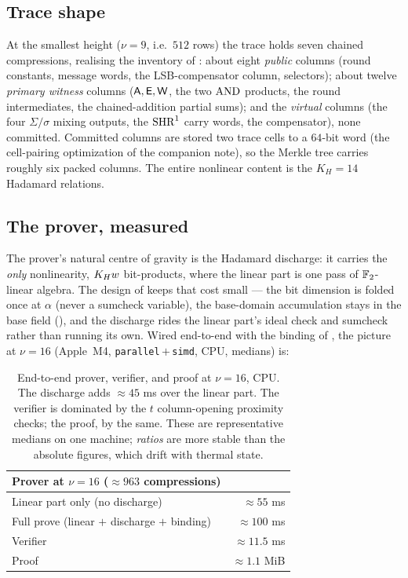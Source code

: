 \subsection{Trace shape}
\label{sec:impl-trace}

At the smallest height ($\nu = 9$, i.e.\ $512$ rows) the trace holds seven
chained compressions, realising the inventory of : about eight
\emph{public} columns (round constants, message words, the LSB-compensator
column, selectors); about twelve \emph{primary witness} columns
($\mathsf{A},\mathsf{E},\mathsf{W}$, the two $\operatorname{AND}$ products, the round intermediates, the
chained-addition partial sums); and the \emph{virtual} columns (the four
$\Sigma/\sigma$ mixing outputs, the $\operatorname{SHR}^{1}$ carry words, the compensator),
none committed. Committed columns are stored two trace cells to a $64$-bit word
(the cell-pairing optimization of the companion note), so the Merkle tree carries
roughly six packed columns. The entire nonlinear content is the $K_H = 14$
Hadamard relations.

\subsection{The prover, measured}
\label{sec:impl-discharge}

The prover's natural centre of gravity is the Hadamard discharge: it carries the
\emph{only} nonlinearity, $K_Hw$ bit-products, where the linear part is one
pass of $\mathbb{F}_2$-linear algebra. The design of  keeps that cost
small --- the bit dimension is folded once at $\alpha$ (never a sumcheck
variable), the base-domain accumulation stays in the base field
(), and the discharge rides the linear part's ideal check and
sumcheck rather than running its own. Wired end-to-end with the binding of
, the picture at $\nu = 16$ (Apple~M4,
\texttt{parallel}\,$+$\,\texttt{simd}, CPU, medians) is:

\begin{table}[h]
\centering
\renewcommand{\arraystretch}{1.2}
\begin{tabular}{l r}
\toprule
Prover at $\nu = 16$ ($\approx 963$ compressions) & \\
\midrule
Linear part only (no discharge) & $\approx 55$ ms \\
Full prove (linear $+$ discharge $+$ binding) & $\approx 100$ ms \\
\midrule
Verifier & $\approx 11.5$ ms \\
Proof & $\approx 1.1$ MiB \\
\bottomrule
\end{tabular}
\caption{End-to-end prover, verifier, and proof at $\nu = 16$, CPU. The discharge
adds $\approx 45$ ms over the linear part. The verifier is dominated by the $t$
column-opening proximity checks; the proof, by the same. These are
representative medians on one machine; \emph{ratios} are more stable than the
absolute figures, which drift with thermal state.}
\label{tab:impl-headline}
\end{table}

